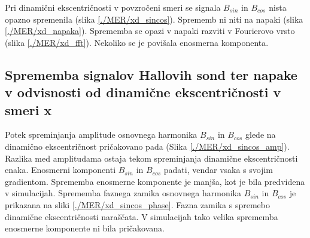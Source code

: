 Pri dinamični ekscentričnosti v povzročeni smeri se signala $B_{sin}$ in $B_{cos}$ nista opazno spremenila (slika \ref{./MER/xd_sincos}). Sprememb ni niti na napaki (slika \ref{./MER/xd_napaka}). Sprememba se opazi v  napaki razviti v Fourierovo vrsto (slika \ref{./MER/xd_fft}). Nekoliko se je povišala enosmerna komponenta.
\subsection{Sprememba signalov Hallovih sond ter napake v odvisnosti od dinamične ekscentričnosti v smeri x}

Potek spreminjanja amplitude osnovnega harmonika $B_{sin}$ in $B_{cos}$ glede na dinamično ekscentričnost pričakovano pada (Slika \ref{./MER/xd_sincos_amp}). Razlika med amplitudama ostaja tekom spreminjanja dinamične ekscentričnosti enaka. Enosmerni komponenti $B_{sin}$ in $B_{cos}$ padati, vendar vsaka s svojim gradientom. Sprememba enosmerne komponente je manjša, kot je bila predvidena v simulacijah. Sprememba faznega zamika osnovnega harmonika $B_{sin}$ in $B_{cos}$ je prikazana na sliki \ref{./MER/xd_sincos_phase}. Fazna zamika s spremebo dinamične ekscentričnosti naraščata. V simulacijah tako velika sprememba enosmerne komponente ni bila pričakovana.

